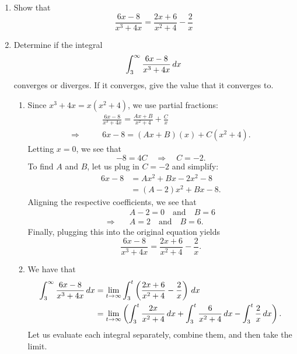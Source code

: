 \documentclass{ximera}
\begin{document}
\begin{problem}
		\begin{enumerate}
	\item  Show that 
		\begin{equation*}
		\frac{6x-8}{x^3+4x} = \frac{2x+6}{x^2+4} - \frac{2}{x}
		\end{equation*}
	
	\item  Determine if the integral
		\begin{equation*}
		\int_3^\infty \frac{6x-8}{x^3+4x} \,d x
		\end{equation*}
	converges or diverges.  If it converges, give the value that it converges to.
	
	
	
	\begin{freeResponse}
	\begin{enumerate}
	\item
	Since $x^3+4x = x(x^2+4)$, we use partial fractions:
		\begin{align*}
		&\frac{6x-8}{x^3+4x} = \frac{Ax+B}{x^2+4} + \frac{C}{x}  \\
		\Longrightarrow 	\qquad	&6x-8 = (Ax+B)(x) + C(x^2+4).
		\end{align*}
	Letting $x=0$, we see that
		\begin{equation*}
		-8 = 4C \quad \Longrightarrow \quad C = -2.
		\end{equation*}
	To find $A$ and $B$, let us plug in $C=-2$ and simplify:
		\begin{align*}
		6x-8 &= Ax^2 + Bx -2x^2 - 8  \\
		&= (A-2)x^2 + Bx - 8.
		\end{align*}
	Aligning the respective coefficients, we see that
		\begin{align*}
		&A-2 = 0	\quad	\text{and}	\quad	B=6  \\
		\Longrightarrow		\quad	&A=2	\quad	\text{and}	\quad	B=6.
		\end{align*}
	Finally, plugging this into the original equation yields
		\begin{equation*}
		\frac{6x-8}{x^3+4x} = \frac{2x+6}{x^2+4} - \frac{2}{x}.
		\end{equation*}
		
		
		
		
	\item We have that
		\begin{align*}
		\int_3^\infty \frac{6x-8}{x^3+4x} \,d x &= \lim_{t \to \infty} \int_3^t \left( \frac{2x+6}{x^2+4} - \frac{2}{x} \right) \,d x  \\
		&= \lim_{t \to \infty} \left( \int_3^t \frac{2x}{x^2+4} \,d x + \int_3^t \frac{6}{x^2+4} \,d x - \int_3^t \frac{2}{x} \,d x \right).
		\end{align*}
	Let us evaluate each integral separately, combine them, and then take the limit.
	

\end{enumerate}
\end{freeResponse}
\end{enumerate}
\end{problem}
\end{document}
